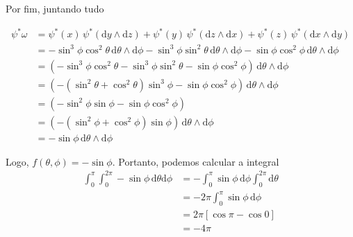 \documentclass[a4paper, 11pt]{article}
\newcommand{\rd}{\mathrm d}
\begin{document}
\begin{enumerate}[leftmargin=*, label=\alph*.]
    Por fim, juntando tudo

    \begin{align*}
        \psi^* \omega &= \psi^* (x) \, \psi^*(\rd y \wedge \rd z) + \psi^* (y) \, \psi^* (\rd z \wedge \rd x) + \psi^* (z) \, \psi^* (\rd x \wedge \rd y)\\
        &= -\sin^3 \phi \cos^2 \theta \, \rd \theta \wedge \rd \phi -\sin^3 \phi \sin^2 \theta \, \rd \theta \wedge \rd \phi - \sin \phi \cos^2 \phi \, \rd \theta \wedge \rd \phi\\
        &= (-\sin^3 \phi \cos^2 \theta  -\sin^3 \phi \sin^2 \theta  - \sin \phi \cos^2 \phi) \, \rd \theta \wedge \rd \phi\\
        &= (-(\sin^2 \theta + \cos^2 \theta)\sin^3 \phi  -\sin \phi \cos^2 \phi) \, \rd \theta \wedge \rd \phi\\
        &=(-\sin^2 \phi \sin \phi - \sin\phi \cos^2 \phi)\\
        &= (-(\sin^2 \phi + \cos^2 \phi)\sin\phi) \, \rd \theta \wedge \rd \phi\\
        &= -\sin \phi \, \rd \theta \wedge \rd \phi
    \end{align*}

    Logo, $f(\theta, \phi) = -\sin \phi$.
    Portanto, podemos calcular a integral
    \begin{align*}
        \int_0^\pi \int_0^{2\pi} -\sin \phi \, \rd \theta \rd \phi &= -\int_{0}^{\pi} \sin \phi \, \rd \phi \int_0^{2\pi} \rd \theta\\
        &= -2\pi \int_0^{\pi} \sin \phi \, \rd \phi\\
        &= 2\pi [\cos \pi - \cos 0]\\
        &= -4\pi
    \end{align*}
\end{enumerate}
\end{document}
